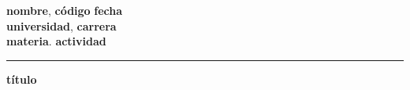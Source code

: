\documentclass[11pt]{article}
\newcommand{\nombre}{nombre}
\newcommand{\codigo}{código}
\newcommand{\institucion}{universidad}
\newcommand{\carrera}{carrera}
\newcommand{\materia}{materia}
\newcommand{\trabajo}{actividad}
\newcommand{\fecha}{fecha}
\newcommand{\titulo}{título}
\begin{document}
\textbf{\nombre}, \textbf{\codigo} \hfill \textbf{\fecha} \\
\textbf{\institucion}, \textbf{\carrera} \\
\textbf{\materia}. \textbf{\trabajo} \\
\smallskip\hrule\bigskip
\begin{center}
\Large{\textbf{\titulo}}
\end{center}
\end{document}
